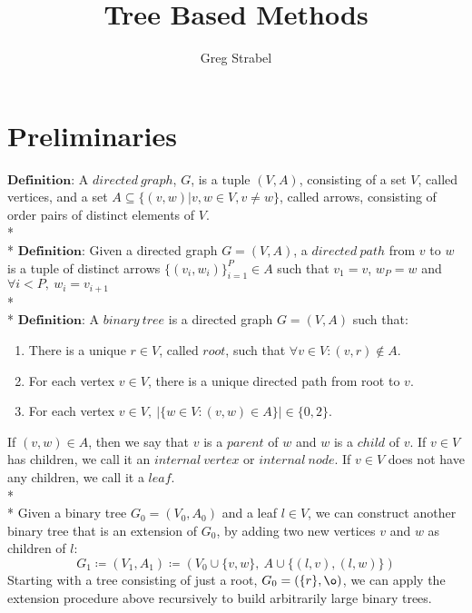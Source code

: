 \documentclass[11pt]{article}
\author{Greg Strabel}
\title{Tree Based Methods}
\begin{document}
\maketitle
\section{Preliminaries}
$\mathbf{Definition}$: A $directed\ graph$, $G$, is a tuple $\left( V,A \right)$, consisting of a set $V$, called vertices, and a set $A \subseteq \{ \left( v, w  \right) | v,w \in V, v \neq w \}$, called arrows, consisting of order pairs of distinct elements of $V$.
\\*
\\*
$\mathbf{Definition}$: Given a directed graph $G = \left( V,A \right)$, a $directed\ path$ from $v$ to $w$ is a tuple of distinct arrows $\{ \left(v_i, w_i \right) \}_{i=1}^P \in A$ such that $v_1 = v$, $w_P = w$ and $\forall i < P, \ w_i = v_{i+1}$
\\*
\\*
$\mathbf{Definition}$: A $binary\ tree$ is a directed graph $G = \left( V,A \right)$ such that:
\begin{enumerate}
\item There is a unique $r \in V$, called $root$, such that $\forall v \in V : \left( v,r \right) \notin A$.
\item For each vertex $v \in V$, there is a unique directed path from root to $v$.
\item For each vertex $v \in V, \ \left| \{ w \in V : \left( v,w \right) \in A \} \right| \in \{ 0,2 \}$.
\end{enumerate}
If $\left(v,w\right) \in A$, then we say that $v$ is a $parent$ of $w$ and $w$ is a $child$ of $v$. If $v \in V$ has children, we call it an $internal\ vertex$ or $internal\ node$.
If $v \in V$ does not have any children, we call it a $leaf$.
\\*
\\*
Given a binary tree $G_0 = \left( V_0, A_0 \right)$ and a leaf $l \in V$, we can construct another binary tree that is an extension of $G_0$, by adding two new vertices $v$ and $w$ as children of $l$:
\begin{equation} \label{treeExt}
G_1 \coloneqq \left( V_1,A_1 \right) \coloneqq
\left(
V_0 \cup \{ v, w \} ,\ 
A \cup \{ \left( l, v \right) , \left( l,w \right) \}
\right)
\end{equation}
Starting with a tree consisting of just a root, $G_0 = \left( \{ r \} , \o \right)$, we can apply the extension procedure above recursively to build arbitrarily large binary trees.
\end{document}
